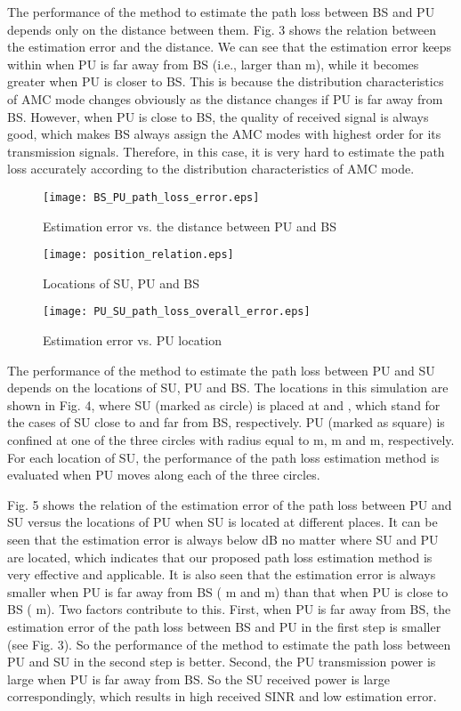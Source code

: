 \documentclass[conference]{IEEEtran}
\begin{document}
The performance of the method to estimate the path loss between BS
and PU depends only on the distance between them. Fig. 3 shows the
relation between the estimation error and the distance. We can see
that the estimation error keeps within  when PU is far away
from BS (i.e., larger than  m), while it becomes greater when
PU is closer to BS. This is because the distribution characteristics
of AMC mode changes obviously as the distance changes if PU is far
away from BS. However, when PU is close to BS, the quality of
received signal is always good, which makes BS always assign the AMC
modes with highest order for its transmission signals. Therefore, in
this case, it is very hard to estimate the path loss accurately
according to the distribution characteristics of AMC mode.

\begin{figure}[!t]
\centering
\texttt{[image: BS\_PU\_path\_loss\_error.eps]}
\caption{Estimation error vs. the distance between PU and BS}
\label{BS_PU path loss}
\end{figure}

\begin{figure}[!t]
\centering
\texttt{[image: position\_relation.eps]}
\caption{Locations of SU, PU and BS} \label{position relation}
\end{figure}

\begin{figure}[!t]
\centering
\texttt{[image: PU\_SU\_path\_loss\_overall\_error.eps]}
\caption{Estimation error vs. PU location }
\label{PU_SU path loss}
\end{figure}

The performance of the method to estimate the path loss between PU
and SU depends on the locations of SU, PU and BS. The locations in
this simulation are shown in Fig. 4, where SU (marked as circle) is
placed at  and , which stand for the cases of
SU close to  and far from BS, respectively. PU (marked as square) is
confined at one of the three circles with radius  equal to
 m,  m and  m, respectively. For each location of SU,
the performance of the path loss estimation method is evaluated when
PU moves along each of the three circles.

Fig. 5 shows the relation of the estimation error of the path loss
between PU and SU versus the locations of PU when SU is located at
different places. It can be seen that the estimation error is always
below  dB no matter where SU and PU are located, which
indicates that our proposed path loss estimation method is very
effective and applicable. It is also seen that the estimation error
is always smaller when PU is far away from BS ( m and 
m) than that when PU is close to BS ( m).  Two factors
contribute to this. First, when PU is far away from BS, the
estimation error of the path loss between BS and PU in the first
step is smaller (see Fig. 3). So the performance of the method to
estimate the path loss between PU and SU in the second step is
better. Second, the PU transmission power is large when PU is far
away from BS. So the SU received power is large correspondingly,
which results in high received SINR and low estimation error.
\end{document}
